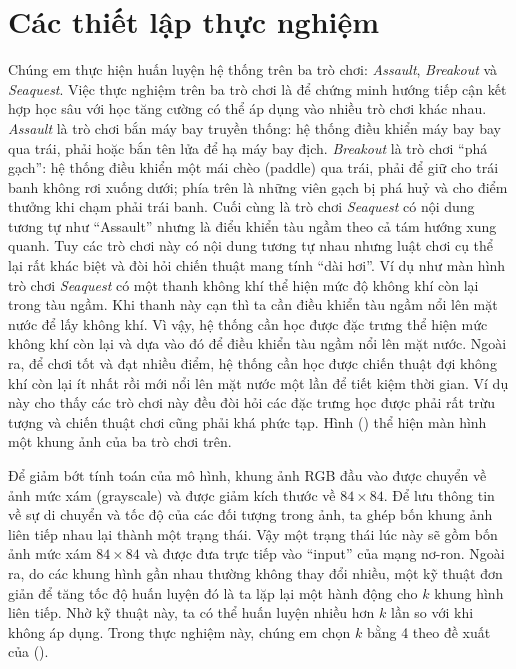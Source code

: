 \section{Các thiết lập thực nghiệm}
	Chúng em thực hiện huấn luyện hệ thống trên ba trò chơi: \textit{Assault}, \textit{Breakout} và \textit{Seaquest}.
	Việc thực nghiệm trên ba trò chơi là để chứng minh hướng tiếp cận kết hợp học sâu với học tăng cường có thể áp dụng vào nhiều trò chơi khác nhau.
	\textit{Assault} là trò chơi bắn máy bay truyền thống: hệ thống điều khiển máy bay bay qua trái, phải hoặc bắn tên lửa để hạ máy bay địch.
	\textit{Breakout} là trò chơi ``phá gạch'': hệ thống điều khiển một mái chèo (paddle) qua trái, phải để giữ cho trái banh không rơi xuống dưới; phía trên là những viên gạch bị phá huỷ và cho điểm thưởng khi chạm phải trái banh.
	Cuối cùng là trò chơi \textit{Seaquest} có nội dung tương tự như ``Assault'' nhưng là điểu khiển tàu ngầm theo cả tám hướng xung quanh.
	Tuy các trò chơi này có nội dung tương tự nhau nhưng luật chơi cụ thể lại rất khác biệt và đòi hỏi chiến thuật mang tính ``dài hơi''.
	Ví dụ như màn hình trò chơi \textit{Seaquest} có một thanh không khí thể hiện mức độ không khí còn lại trong tàu ngầm.
	Khi thanh này cạn thì ta cần điều khiển tàu ngầm nổi lên mặt nước để lấy không khí.
	Vì vậy, hệ thống cần học được đặc trưng thể hiện mức không khí còn lại và dựa vào đó để điều khiển tàu ngầm nổi lên mặt nước.
	Ngoài ra, để chơi tốt và đạt nhiều điểm, hệ thống cần học được chiến thuật đợi không khí còn lại ít nhất rồi mới nổi lên mặt nước một lần để tiết kiệm thời gian.
	Ví dụ này cho thấy các trò chơi này đều đòi hỏi các đặc trưng học được phải rất trừu tượng và chiến thuật chơi cũng phải khá phức tạp.
	Hình () thể hiện màn hình một khung ảnh của ba trò chơi trên.
	
	Để giảm bớt tính toán của mô hình, khung ảnh RGB đầu vào được chuyển về ảnh mức xám (grayscale) và được giảm kích thước về $84\times84$.
	Để lưu thông tin về sự di chuyển và tốc độ của các đối tượng trong ảnh, ta ghép bốn khung ảnh liên tiếp nhau lại thành một trạng thái.
	Vậy một trạng thái lúc này sẽ gồm bốn ảnh mức xám $84\times84$ và được đưa trực tiếp vào ``input'' của mạng nơ-ron.
	Ngoài ra, do các khung hình gần nhau thường không thay đổi nhiều, một kỹ thuật đơn giản để tăng tốc độ huấn luyện đó là ta lặp lại một hành động cho $k$ khung hình liên tiếp.
	Nhờ kỹ thuật này, ta có thể huấn luyện nhiều hơn $k$ lần so với khi không áp dụng.
	Trong thực nghiệm này, chúng em chọn $k$ bằng 4 theo đề xuất của (\cite{mnih2013playing}).
	

